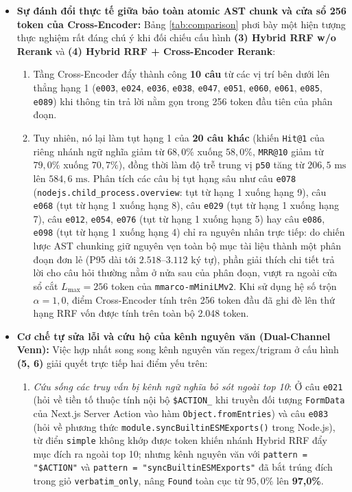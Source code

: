 \begin{itemize}
    \item \textbf{Sự đánh đổi thực tế giữa bảo toàn atomic AST chunk và cửa sổ 256 token của Cross-Encoder:} Bảng \ref{tab:comparison} phơi bày một hiện tượng thực nghiệm rất đáng chú ý khi đối chiếu cấu hình \textbf{(3) Hybrid RRF w/o Rerank} và \textbf{(4) Hybrid RRF + Cross-Encoder Rerank}:
    \begin{enumerate}
        \item Tầng Cross-Encoder đẩy thành công \textbf{10 câu} từ các vị trí bên dưới lên thẳng hạng 1 (\texttt{e003}, \texttt{e024}, \texttt{e036}, \texttt{e038}, \texttt{e047}, \texttt{e051}, \texttt{e060}, \texttt{e061}, \texttt{e085}, \texttt{e089}) khi thông tin trả lời nằm gọn trong 256 token đầu tiên của phân đoạn.
        \item Tuy nhiên, nó lại làm tụt hạng 1 của \textbf{20 câu khác} (khiến \texttt{Hit@1} của riêng nhánh ngữ nghĩa giảm từ $68,0\%$ xuống $58,0\%$, \texttt{MRR@10} giảm từ $79,0\%$ xuống $70,7\%$), đồng thời làm độ trễ trung vị \texttt{p50} tăng từ $206,5\text{ ms}$ lên $584,6\text{ ms}$. Phân tích các câu bị tụt hạng sâu như câu \texttt{e078} (\nolinkurl{nodejs.child_process.overview}: tụt từ hạng 1 xuống hạng 9), câu \texttt{e068} (tụt từ hạng 1 xuống hạng 8), câu \texttt{e029} (tụt từ hạng 1 xuống hạng 7), câu \texttt{e012}, \texttt{e054}, \texttt{e076} (tụt từ hạng 1 xuống hạng 5) hay câu \texttt{e086}, \texttt{e098} (tụt từ hạng 1 xuống hạng 4) chỉ ra nguyên nhân trực tiếp: do chiến lược AST chunking giữ nguyên vẹn toàn bộ mục tài liệu thành một phân đoạn đơn lẻ (P95 dài tới $2.518$--$3.112$ ký tự), phần giải thích chi tiết trả lời cho câu hỏi thường nằm ở nửa sau của phân đoạn, vượt ra ngoài cửa sổ cắt $L_{\max} = 256$ token của \texttt{mmarco-mMiniLMv2}. Khi sử dụng hệ số trộn $\alpha = 1,0$, điểm Cross-Encoder tính trên 256 token đầu đã ghi đè lên thứ hạng RRF vốn được tính trên toàn bộ 2.048 token.
    \end{enumerate}
    \item \textbf{Cơ chế tự sửa lỗi và cứu hộ của kênh nguyên văn (Dual-Channel Venn):} Việc hợp nhất song song kênh nguyên văn regex/trigram ở cấu hình \textbf{(5, 6)} giải quyết trực tiếp hai điểm yếu trên:
    \begin{enumerate}
        \item \textit{Cứu sống các truy vấn bị kênh ngữ nghĩa bỏ sót ngoài top 10}: Ở câu \texttt{e021} (hỏi về tiền tố thuộc tính nội bộ \texttt{\$ACTION\_} khi truyền đối tượng \texttt{FormData} của Next.js Server Action vào hàm \nolinkurl{Object.fromEntries}) và câu \texttt{e083} (hỏi về phương thức \nolinkurl{module.syncBuiltinESMExports()} trong Node.js), từ điển \texttt{simple} không khớp được token khiến nhánh Hybrid RRF đẩy mục đích ra ngoài top 10; nhưng kênh nguyên văn với \texttt{pattern = "\$ACTION"} và \texttt{pattern = "syncBuiltinESMExports"} đã bắt trúng đích trong giỏ \texttt{verbatim\_only}, nâng \texttt{Found} toàn cục từ $95,0\%$ lên \textbf{97,0\%}.

\end{enumerate}
\end{itemize}
